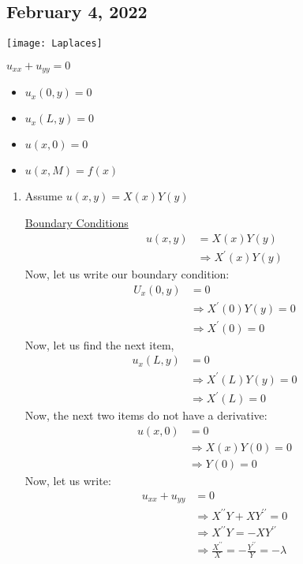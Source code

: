 \subsection*{February 4, 2022}
\begin{center}
  \texttt{[image: Laplaces]}

  $u_{xx} + u_{yy} = 0$
\end{center}
\begin{itemize}
  \item $u_x(0, y) = 0$
  \item $u_x(L, y) = 0$
  \item $u(x, 0) = 0$
  \item $u(x, M) = f(x)$
\end{itemize}
\begin{enumerate}
  \item Assume $u(x, y) = X(x)Y(y)$

  \underline{Boundary Conditions}
  \begin{align}
    u(x, y) & = X(x) Y(y)\\
    & \Rightarrow X^\prime(x)Y(y)
  \end{align}
  Now, let us write our boundary condition:
  \begin{align}
    U_x(0, y) & = 0\\
    & \Rightarrow X^\prime(0)Y(y) = 0\\
    & \Rightarrow X^\prime(0) = 0
  \end{align}
  Now, let us find the next item,
  \begin{align}
    u_x(L, y) & = 0\\
    & \Rightarrow X^\prime(L)Y(y) = 0\\
    & \Rightarrow X^\prime(L) = 0
  \end{align}
  Now, the next two items do not have a derivative:
  \begin{align}
    u(x, 0) & = 0\\
    & \Rightarrow X(x)Y(0) = 0\\
    & \Rightarrow Y(0) = 0
  \end{align}
  Now, let us write:
  \begin{align}
    u_{xx} + u_{yy} & = 0\\
    & \Rightarrow X^{\prime\prime}Y + XY^{\prime\prime} = 0\\
    & \Rightarrow X^{\prime\prime}Y = - XY^{\prime\prime}\\
    & \Rightarrow \frac{X^{\prime\prime}}{X} = - \frac{Y^{\prime\prime}}{Y} = -\lambda
  \end{align}


\end{enumerate}
